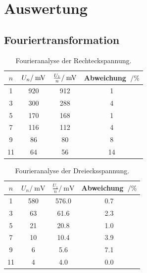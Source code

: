 \section{Auswertung}
\label{sec:Auswertung}
\subsection{Fouriertransformation}
\label{FT}

\begin{table}
	\centering
	\begin{tabular}{S[table-format=2.0] S[table-format=3.0] S[table-format=3.0] S[table-format=2.2]}
	\toprule
{$n$} & {$U_n/\:\si{\milli{\volt}}$} & {$\frac{U_1}{n}/\:\si{\milli{\volt}}$} & {Abweichung $\:/\%$}\\
	 & 920 & 912 &  1\\
 3 & 300 & 288 &  4\\
 5 & 170 & 168 &  1\\
 7 & 116 & 112 &  4\\
 9 &  86 &  80 &  8\\
11 &  64 &  56 & 14\\
	\bottomrule
	\end{tabular}
	\caption{Fourieranalyse der Rechteckspannung.}
	\label{tab:FA_RE}
\end{table}
 
\begin{table}
	\centering
	\begin{tabular}{S[table-format=2.0] S[table-format=3.0] S[table-format=3.1] S[table-format=1.2] }
	\toprule
	{$n$} & {$U_n/\:\si{\milli\volt}$} & {$\frac{U_1}{n}/\:\si{\milli\volt}$} & {Abweichung $\:/\%$}\\
	 & 580 & 576.0 & 0.7\\
 3 &  63 &  61.6 & 2.3\\
 5 &  21 &  20.8 & 1.0\\
 7 &  10 &  10.4 & 3.9\\
 9 &   6 &   5.6 & 7.1\\
11 &   4 &   4.0 & 0.0\\
	\bottomrule
	\end{tabular}
	\caption{Fourieranalyse der Dreiecksspannung.}
	\label{tab:FA_DE}
\end{table}



